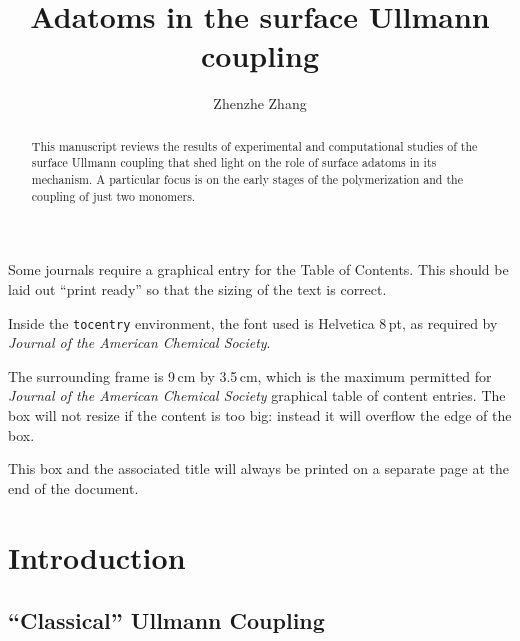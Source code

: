 \documentclass[journal=jacsat,manuscript=article]{achemso}
\author{Zhenzhe Zhang}
\affiliation[McGill University]
{Department of Chemistry, McGill University, Montreal}
\title{Adatoms in the surface Ullmann coupling}
\begin{document}
\begin{tocentry}

Some journals require a graphical entry for the Table of Contents.
This should be laid out ``print ready'' so that the sizing of the
text is correct.

Inside the \texttt{tocentry} environment, the font used is Helvetica
8\,pt, as required by \emph{Journal of the American Chemical
Society}.

The surrounding frame is 9\,cm by 3.5\,cm, which is the maximum
permitted for  \emph{Journal of the American Chemical Society}
graphical table of content entries. The box will not resize if the
content is too big: instead it will overflow the edge of the box.

This box and the associated title will always be printed on a
separate page at the end of the document.

\end{tocentry}


\begin{abstract}
This manuscript reviews the results of experimental and computational studies of the surface Ullmann coupling that shed light on the role of surface adatoms in its mechanism. A particular focus is on the early stages of the polymerization and the coupling of just two monomers.
\end{abstract}

\newpage


\section{Introduction}


\subsection{``Classical'' Ullmann Coupling}
\end{document}
